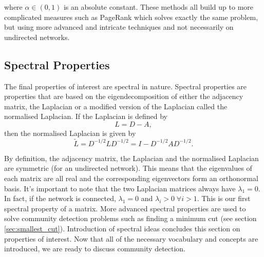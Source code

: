 where $\alpha \in (0, 1)$ is an absolute constant. These methods all build up to more complicated measures such as PageRank \cite{pagerank} which solves exactly the same problem, but using more advanced and intricate techniques and not necessarily on undirected networks.

\subsection{Spectral Properties}
The final properties of interest are spectral in nature. Spectral properties are properties that are based on the eigendecomposition of either the adjacency matrix, the Laplacian or a modified version of the Laplacian called the normalised Laplacian. If the Laplacian is defined by
$$ L = D - A, $$
\noindent
then the normalised Laplacian is given by 
$$ \tilde L = D^{-1/2}LD^{-1/2} = I - D^{-1/2}AD^{-1/2}. $$

By definition, the adjacency matrix, the Laplacian and the normalised Laplacian are symmetric (for an undirected network). This means that the eigenvalues of each matrix are all real and the corresponding eigenvectors form an orthonormal basis. It's important to note that the two Laplacian matrices always have $\lambda_1 = 0$. In fact, if the network is connected, $\lambda_1 = 0$ and $\lambda_i > 0 \; \forall i > 1$. This is our first spectral property of a matrix. More advanced spectral properties are used to solve community detection problems such as finding a minimum cut (see section \ref{sec:smallest_cut}). Introduction of spectral ideas concludes this section on properties of interest. Now that all of the necessary vocabulary and concepts are introduced, we are ready to discuss community detection.
